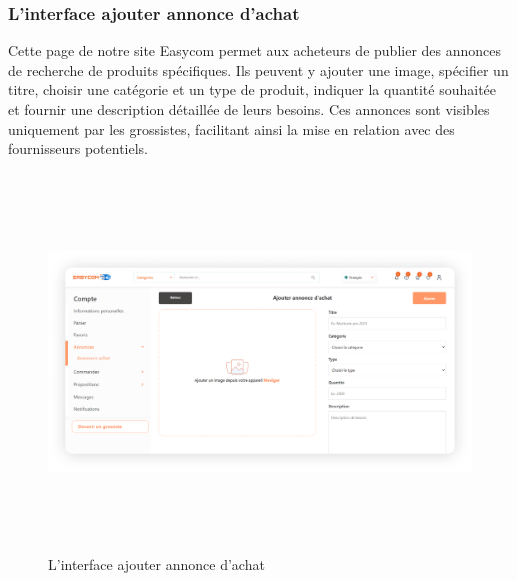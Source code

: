 \documentclass[edit,12pt,a4paper,ChapStyle,oneside,doubleinterligne]{report}
\begin{document}
\subsubsection{L'interface ajouter annonce d’achat}
Cette page de notre site Easycom permet aux acheteurs de publier des annonces de recherche de produits spécifiques. Ils peuvent y ajouter une image, spécifier un titre, choisir une catégorie et un type de produit, indiquer la quantité souhaitée et fournir une description détaillée de leurs besoins. Ces annonces sont visibles uniquement par les grossistes, facilitant ainsi la mise en relation avec des fournisseurs potentiels.
  \begin{figure} [H]
    \centering
    \includegraphics[width = 15.319375cm , height = 10cm , angle=360]{images/ajouter annonce d'achat.png}
    \caption{L'interface ajouter annonce d’achat}
    \label{fig:Ajouter annonce d’achat}
\end{figure}
\end{document}
